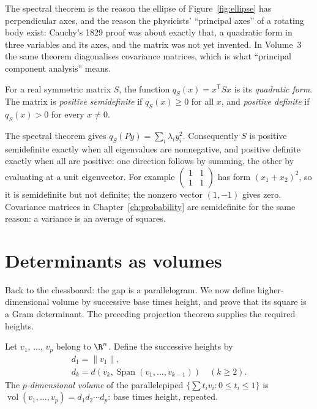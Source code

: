The spectral theorem is the reason the ellipse of Figure~\ref{fig:ellipse} has perpendicular axes, and the reason the physicists' ``principal axes'' of a rotating body exist: Cauchy's 1829 proof was about exactly that, a quadratic form in three variables and its axes, and the matrix was not yet invented. In Volume~3 the same theorem diagonalises covariance matrices, which is what ``principal component analysis'' means.

\begin{definitionx}
For a real symmetric matrix $S$, the function $q_S(x)=x^{\mathsf T}Sx$ is its \emph{quadratic form}. The matrix is \emph{positive semidefinite} if $q_S(x)\ge0$ for all $x$, and \emph{positive definite} if $q_S(x)>0$ for every $x\ne0$.
\end{definitionx}

The spectral theorem gives $q_S(Py)=\sum_i\lambda_i y_i^2$. Consequently $S$ is positive semidefinite exactly when all eigenvalues are nonnegative, and positive definite exactly when all are positive: one direction follows by summing, the other by evaluating at a unit eigenvector. For example $\left(\begin{smallmatrix}1&1\\1&1\end{smallmatrix}\right)$ has form $(x_1+x_2)^2$, so it is semidefinite but not definite; the nonzero vector $(1,-1)$ gives zero. Covariance matrices in Chapter~\ref{ch:probability} are semidefinite for the same reason: a variance is an average of squares.

\section{Determinants as volumes}
Back to the chessboard: the gap is a parallelogram. We now define higher-dimensional volume by successive base times height, and prove that its square is a Gram determinant. The preceding projection theorem supplies the required heights.

\begin{definitionx}[volume]
Let $v_1$, $\dots$, $v_p$ belong to $\R^n$. Define the successive heights by
\[
\begin{gathered}
d_1=\|v_1\|,\\
d_k=d\left(v_k,\operatorname{Span}(v_1,\dots,v_{k-1})\right)\quad(k\ge2).
\end{gathered}
\] The \emph{$p$-dimensional volume} of the parallelepiped $\{\sum t_iv_i:0\le t_i\le1\}$ is $\operatorname{vol}(v_1,\dots,v_p)=d_1d_2\cdots d_p$: base times height, repeated.
\end{definitionx}

